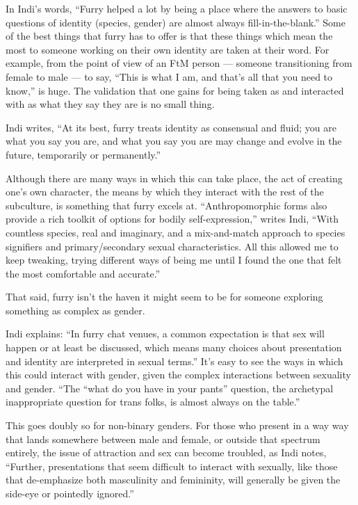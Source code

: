 In Indi's words, ``Furry helped a lot by being a place where the answers to basic questions of identity (species, gender) are almost always fill-in-the-blank.''  Some of the best things that furry has to offer is that these things which mean the most to someone working on their own identity are taken at their word.  For example, from the point of view of an FtM person --- someone transitioning from female to male --- to say, ``This is what I am, and that's all that you need to know,'' is huge.  The validation that one gains for being taken as and interacted with as what they say they are is no small thing.

Indi writes, ``At its best, furry treats identity as consensual and fluid; you are what you say you are, and what you say you are may change and evolve in the future, temporarily or permanently.''

Although there are many ways in which this can take place, the act of creating one's own character, the means by which they interact with the rest of the subculture, is something that furry excels at.  ``Anthropomorphic forms also provide a rich toolkit of options for bodily self-expression,'' writes Indi, ``With countless species, real and imaginary, and a mix-and-match approach to species signifiers and primary/secondary sexual characteristics. All this allowed me to keep tweaking, trying different ways of being me until I found the one that felt the most comfortable and accurate.''

That said, furry isn't the haven it might seem to be for someone exploring something as complex as gender.

Indi explains: ``In furry chat venues, a common expectation is that sex will happen or at least be discussed, which means many choices about presentation and identity are interpreted in sexual terms.'' It's easy to see the ways in which this could interact with gender, given the complex interactions between sexuality and gender. ``The ``what do you have in your pants'' question, the archetypal inappropriate question for trans folks, is almost always on the table.''

This goes doubly so for non-binary genders.  For those who present in a way way that lands somewhere between male and female, or outside that spectrum entirely, the issue of attraction and sex can become troubled, as Indi notes, ``Further, presentations that seem difficult to interact with sexually, like those that de-emphasize both masculinity and femininity, will generally be given the side-eye or pointedly ignored.''

